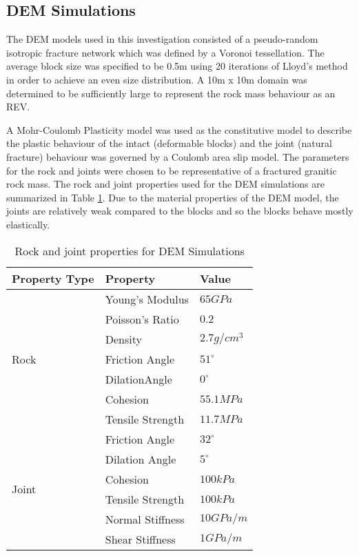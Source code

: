 \subsection{DEM Simulations}

The DEM models used in this investigation consisted of a pseudo-random isotropic fracture network which was defined by a Voronoi tessellation. The average block size was specified to be 0.5m using 20 iterations of Lloyd's method \citep{Lloyd_1982} in order to achieve an even size distribution. A 10m x 10m domain was determined to be sufficiently large to represent the rock mass behaviour as an REV. 

A Mohr-Coulomb Plasticity model was used as the constitutive model to describe the plastic behaviour of the intact  (deformable blocks) and the joint (natural fracture) behaviour was governed by a Coulomb area slip model. The parameters for the rock and joints were chosen to be representative of a fractured granitic rock mass. The rock and joint properties used for the DEM simulations are summarized in Table \ref{tab:demProp}. Due to the material properties of the DEM model, the joints are relatively weak compared to the blocks and so the blocks behave mostly elastically. 

\begin{table}[!htbp]
\centering
\caption{Rock and joint properties for DEM Simulations}
\label{tab:demProp}
\begin{tabular}{@{}lll@{}}
\toprule
Property Type          & Property         & Value        \\ \midrule
\multirow{7}{*}{Rock}  & Young's Modulus  & $65 GPa$     \\
                       & Poisson's Ratio  & $0.2$        \\
                       & Density          & $2.7 g/cm^3$ \\
                       & Friction Angle   & $51^{\circ}$ \\
                       & DilationAngle    & $0^{\circ}$  \\
                       & Cohesion         & $55.1 MPa$   \\
                       & Tensile Strength & $11.7 MPa$   \\ \cmidrule(r){1-1}
\multirow{6}{*}{Joint} & Friction Angle   & $32^{\circ}$ \\
                       & Dilation Angle   & $5^{\circ}$  \\
                       & Cohesion         & $100 kPa$    \\
                       & Tensile Strength & $100 kPa$      \\
                       & Normal Stiffness & $10 GPa/m$   \\
                       & Shear Stiffness  & $1 GPa/m$    \\ \bottomrule
\end{tabular}
\end{table}


